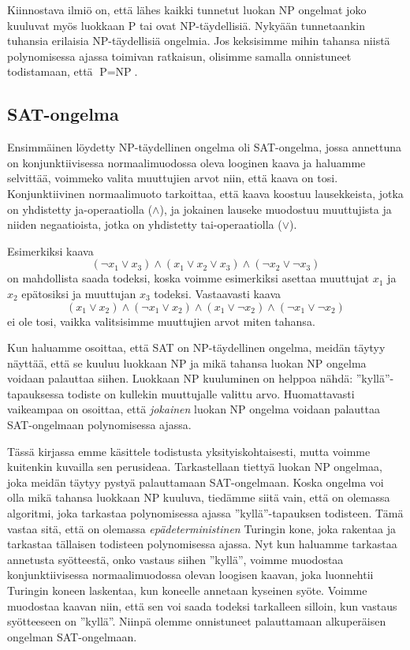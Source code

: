 Kiinnostava ilmiö on, että lähes kaikki tunnetut luokan NP
ongelmat joko kuuluvat myös luokkaan P tai ovat NP-täydellisiä.
Nykyään tunnetaankin tuhansia erilaisia NP-täydellisiä ongelmia.
Jos keksisimme mihin tahansa niistä polynomisessa ajassa toimivan
ratkaisun, olisimme samalla onnistuneet todistamaan,
että $\textrm{P}=\textrm{NP}$.

\subsection{SAT-ongelma}


Ensimmäinen löydetty NP-täydellinen ongelma oli
SAT-ongelma, jossa annettuna on konjunktiivisessa
normaalimuodossa oleva looginen kaava ja haluamme
selvittää, voimmeko valita muuttujien arvot niin,
että kaava on tosi.
Konjunktiivinen normaalimuoto tarkoittaa,
että kaava koostuu lausekkeista, jotka on yhdistetty
ja-operaatiolla ($\land$), ja jokainen lauseke muodostuu
muuttujista ja niiden negaatioista, jotka on yhdistetty
tai-operaatiolla ($\lor$).

Esimerkiksi kaava
\[(\neg x_1 \lor x_3) \land (x_1 \lor x_2 \lor x_3) \land (\neg x_2 \lor \neg x_3)\]
on mahdollista saada todeksi, koska voimme esimerkiksi asettaa
muuttujat $x_1$ ja $x_2$ epätosiksi ja muuttujan $x_3$ todeksi.
Vastaavasti kaava
\[(x_1 \lor x_2) \land (\neg x_1 \lor x_2) \land (x_1 \lor \neg x_2) \land (\neg x_1 \lor \neg x_2) \]
ei ole tosi, vaikka valitsisimme muuttujien arvot miten tahansa.

Kun haluamme osoittaa, että SAT on NP-täydellinen ongelma,
meidän täytyy näyttää, että se kuuluu luokkaan NP ja mikä
tahansa luokan NP ongelma voidaan palauttaa siihen.
Luokkaan NP kuuluminen on helppoa nähdä:
''kyllä''-tapauksessa todiste on kullekin muuttujalle valittu arvo.
Huomattavasti vaikeampaa on osoittaa, että \emph{jokainen} luokan
NP ongelma voidaan palauttaa SAT-ongelmaan polynomisessa ajassa.

Tässä kirjassa emme käsittele todistusta yksityiskohtaisesti,
mutta voimme kuitenkin kuvailla sen perusideaa.
Tarkastellaan tiettyä luokan NP ongelmaa,
joka meidän täytyy pystyä palauttamaan SAT-ongelmaan.
Koska ongelma voi olla mikä tahansa luokkaan NP kuuluva, tiedämme siitä vain,
että on olemassa algoritmi, joka tarkastaa
polynomisessa ajassa ''kyllä''-tapauksen todisteen.
Tämä vastaa sitä, että on olemassa \emph{epädeterministinen} Turingin kone,
joka rakentaa ja tarkastaa tällaisen todisteen polynomisessa ajassa.
Nyt kun haluamme tarkastaa annetusta syötteestä, onko vastaus siihen ''kyllä'',
voimme muodostaa konjunktiivisessa normaalimuodossa olevan loogisen kaavan,
joka luonnehtii Turingin koneen laskentaa, kun koneelle annetaan kyseinen syöte.
Voimme muodostaa kaavan niin, että sen voi saada todeksi tarkalleen silloin,
kun vastaus syötteeseen on ''kyllä''.
Niinpä olemme onnistuneet palauttamaan alkuperäisen ongelman SAT-ongelmaan.

